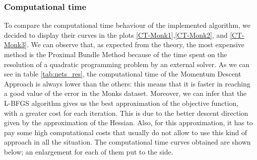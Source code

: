 \subsubsection{Computational time}
\label{sec:computational_time}
To compare the computational time behaviour of the implemented algorithm, we decided to display their curves in the plots \ref{CT-Monk1},\ref{CT-Monk2}, and \ref{CT-Monk3}. We can observe that, as expected from the theory, the most expensive method is the Proximal Bundle Method because of the time spent on the resolution of a quadratic programming problem by an external solver. As we can see in table \ref{tab:nets_res}, the computational time of the Momentum Descent Approach is always lower than the others: this means that it is faster in reaching a good value of the error in the Monks dataset. Moreover, we can infer that the L-BFGS algorithm gives us the best approximation of the objective function, with a greater cost for each iteration. This is due to the better descent direction given by the approximation of the Hessian. Also, for this approximation, it has to pay some high computational costs that usually do not allow to use this kind of approach in all the situation. The computational time curves obtained are shown below; an enlargement for each of them put to the side.


